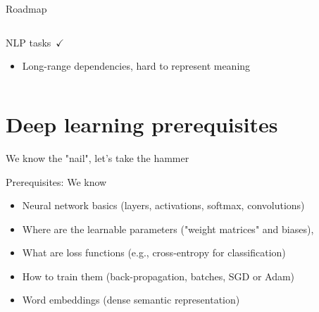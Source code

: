 \documentclass[12pt]{beamer}
\begin{document}
\begin{frame}{Roadmap}
	
	\begin{columns}
		
		\begin{column}{0.5\linewidth}
			
			
			NLP tasks $\checkmark$
			
			\begin{itemize}
				\item {\scriptsize Long-range dependencies, hard to represent meaning}
			\end{itemize}
			
			
		\end{column}
		
		\begin{column}{0.5\linewidth}
			

			
		\end{column}
		
	\end{columns}
	
\end{frame}


\section{Deep learning prerequisites}

\begin{frame}{We know the "nail", let's take the hammer}

Prerequisites: We know

\begin{itemize}

	\item  Neural network basics (layers, activations, softmax, convolutions)

	\item  Where are the learnable parameters ("weight matrices" and biases),

	\item  What are loss functions (e.g., cross-entropy for classification)

	\item  How to train them (back-propagation, batches, SGD or Adam)

	\item  Word embeddings (dense semantic representation)

\end{itemize}
	
\end{frame}
\end{document}
